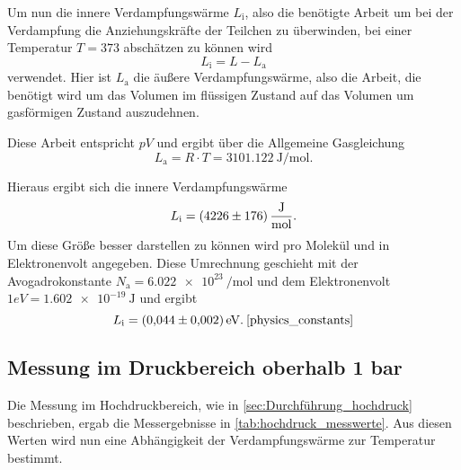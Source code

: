 Um nun die innere Verdampfungswärme $L_\text{i}$, also die benötigte Arbeit um bei der Verdampfung die Anziehungskräfte der Teilchen zu überwinden, bei einer Temperatur $T=373$ abschätzen zu können wird
\begin{equation}
    L_\text{i} = L - L_\text{a}
\end{equation}
verwendet. 
Hier ist $L_\text{a}$ die äußere Verdampfungswärme, also die Arbeit, die benötigt wird um das Volumen im flüssigen Zustand auf das Volumen um gasförmigen Zustand auszudehnen.\cite{V203}

Diese Arbeit entspricht $pV$ und ergibt über die Allgemeine Gasgleichung
\begin{equation*}
    L_\text{a} = R \cdot T = \SI{3101.122}{\joule\per\mol}.
\end{equation*}

Hieraus ergibt sich die innere Verdampfungswärme
\begin{equation*}
    L_\text{i} = \SI{4226+-176}{\joule\per\mol}.
\end{equation*}
Um diese Größe besser darstellen zu können wird pro Molekül und in Elektronenvolt angegeben.
Diese Umrechnung geschieht mit der Avogadrokonstante $N_\text{a} = \SI{6.022e23}{\per\mol}$ und dem Elektronenvolt $1 eV = \SI{1.602e-19}{\joule}$ und ergibt
\begin{equation*}
    L_\text{i} = \SI{0.044+-0.002}{\electronvolt}. \: \text{\cite{physics_constants}}
\end{equation*}


\subsection{Messung im Druckbereich oberhalb 1 bar}
\label{sec:Auswertung_hochdruck}

Die Messung im Hochdruckbereich, wie in \autoref{sec:Durchführung_hochdruck} beschrieben, ergab die Messergebnisse in \autoref{tab:hochdruck_messwerte}.
Aus diesen Werten wird nun eine Abhängigkeit der Verdampfungswärme zur Temperatur bestimmt.

